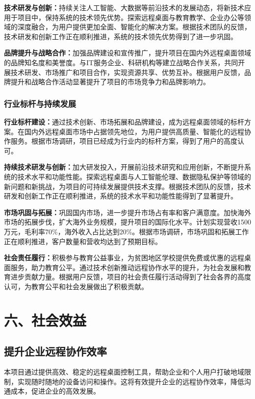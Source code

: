 \documentclass[12pt,a4paper]{article}
\begin{document}
\textbf{技术研发与创新：}持续关注人工智能、大数据等前沿技术的发展动态，将新技术应用于项目中，保持系统的技术领先优势。探索远程桌面与教育教学、企业办公等领域的深度融合，为用户提供更加全面、智能化的解决方案。根据技术团队的反馈，技术研发和创新工作正在顺利推进，系统的技术领先优势得到了进一步巩固。

\textbf{品牌提升与战略合作：}加强品牌建设和宣传推广，提升项目在国内外远程桌面领域的品牌知名度和美誉度。与IT服务企业、科研机构等建立战略合作关系，共同开展技术研发、市场推广和项目合作，实现资源共享、优势互补。根据用户反馈，品牌提升和战略合作活动显著提升了项目的市场竞争力和品牌影响力。

\subsubsection{行业标杆与持续发展}
\textbf{行业标杆建设：}通过技术创新、市场拓展和品牌建设，成为远程桌面领域的标杆方案。在国内外远程桌面市场中占据领先地位，为用户提供高质量、智能化的远程协作服务。根据市场调研，项目已经成为行业内的标杆方案，得到了用户的高度认可。

\textbf{持续技术研发与创新：}加大研发投入，开展前沿技术研究和应用创新，不断提升系统的技术水平和功能性能。探索远程桌面与人工智能伦理、数据隐私保护等领域的新问题和新挑战，为项目的可持续发展提供技术支撑。根据技术团队的反馈，技术研发和创新工作正在顺利推进，系统的技术水平和功能性能得到了显著提升。

\textbf{市场巩固与拓展：}巩固国内市场，进一步提升市场占有率和客户满意度。加快海外市场的拓展步伐，扩大海外业务规模，提升项目的国际化水平。计划实现营收1500万元，毛利率70\%，海外收入占比达到20\%。根据市场调研，市场巩固和拓展工作正在顺利推进，客户数量和营收均达到了预期目标。

\textbf{社会责任履行：}积极参与教育公益事业，为贫困地区学校提供免费或优惠的远程桌面服务，助力教育公平。通过技术创新推动远程协作水平的提升，为社会发展和教育进步贡献力量。根据用户反馈，项目的社会责任履行活动得到了社会各界的高度认可，为教育公平和社会发展做出了积极贡献。

\section{六、社会效益}

\subsection{提升企业远程协作效率}
本项目通过提供高效、稳定的远程桌面控制工具，帮助企业和个人用户打破地域限制，实现随时随地的设备访问和操作。这将有效提升企业的远程协作效率，降低沟通成本，促进企业的高效发展。
\end{document}
